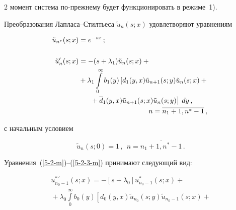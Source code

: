 \begin{multicols}{2}
момент система по-преж\-не\-му будет функционировать в режиме~1).


Преобразования Лап\-ла\-са--Стил\-тье\-са $\tilde{u}_n(s;x)$ удовлетворяют уравнениям 


\begin{align*}


\tilde{u}_{n^*}(s;x)&= e^{-sx} \,;\\


\\


\tilde{u}'_n(s;x) &= - (s + \lambda_1) \tilde{u}_{n}(s;x) +{}


\\


&{}+


\lambda_1 \int\limits_0^\infty b_1(y) \left[d_1(y,x) \tilde{u}_{n+1}(s;y) \tilde{u}_{n}(s;x)


+ {}\right.\\


&\hspace*{5mm}\left.{}+\d_1(y,x) \tilde{u}_{n+1}(s;x) \tilde{u}_{n}(s;y)\right] \, dy\,,


\\  


&\hspace*{35mm}n=\overline{n_{1}+1,n^*-1}\,,


\end{align*}




с начальным условием


$$


\tilde{u}_n(s;0)=1\,,


\ \ n=\overline{n_1+1,n^*-1}\,.


$$


Уравнения~(\ref{5-2-m})--(\ref{5-2-3-m}) принимают следующий вид:




\begin{multline*}




u^{*\,\prime}_{n_0-1}(s;x) = - \left[s + \lambda_0\right] u^*_{n_0-1}(s;x)


+{}


\\


{}+


\lambda_0 \int\limits_0^\infty b_0(y) \left[d_0(y,x) \tilde{u}_{n_0}(s;y) \tilde{u}_{n_0-1}(s;x)


+{}\right.\\



\end{multline*}
\end{multicols}
